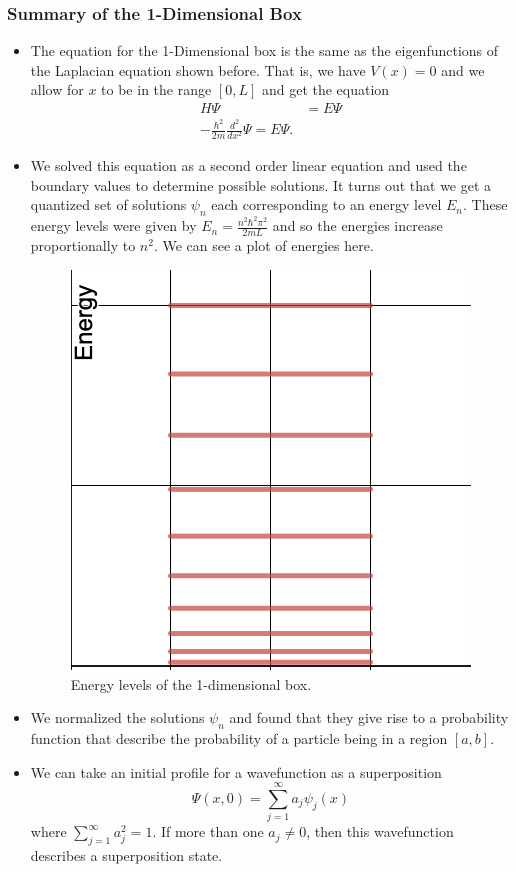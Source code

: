 \subsubsection{Summary of the 1-Dimensional Box}
\begin{itemize}
    \item The equation for the 1-Dimensional box is the same as the eigenfunctions of the Laplacian equation shown before. That is, we have $V(x)=0$ and we allow for $x$ to be in the range $[0,L]$ and get the equation
    \begin{align*}
        H\Psi &= E \Psi\\
        -\frac{\hbar^2}{2m}\frac{d^2}{dx^2}\Psi = E \Psi.
    \end{align*}
    \item We solved this equation as a second order linear equation and used the boundary values to determine possible solutions.  It turns out that we get a quantized set of solutions $\psi_n$ each corresponding to an energy level $E_n$. These energy levels were given by $E_n = \frac{n^2 \hbar^2 \pi^2}{2mL}$ and so the energies increase proportionally to $n^2$. We can see a plot of energies here.
    \begin{figure}[H]
        \centering
        \includegraphics[width=.5\textwidth]{Figures_Part_2/energy_levels.png}
        \caption{Energy levels of the 1-dimensional box.}
    \end{figure}
    \item We normalized the solutions $\psi_n$ and found that they give rise to a probability function that describe the probability of a particle being in a region $[a,b]$. 
    \item We can take an initial profile for a wavefunction as a superposition
    \[
    \Psi(x,0)=\sum_{j=1}^\infty a_j \psi_j(x)
    \]
    where $\sum_{j=1}^\infty a_j^2 = 1$. If more than one $a_j\neq 0$, then this wavefunction describes a superposition state. 

\end{itemize}
